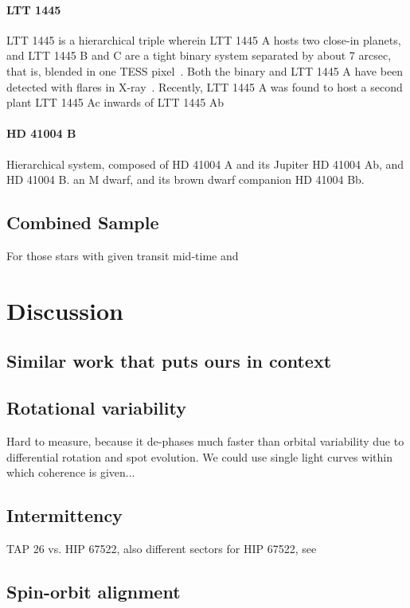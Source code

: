 \documentclass[twocolumn]{aastex631}
\begin{document}
\paragraph{LTT 1445}
 LTT 1445 is a hierarchical triple wherein LTT 1445 A hosts two close-in planets, and LTT 1445 B and C are a tight binary system separated by about 7 arcsec, that is, blended in one TESS pixel~\citep{winters2019three}. Both the binary and LTT 1445 A have been detected with flares in X-ray~\citep{brown2022xray}. Recently, LTT 1445 A was found to host a second plant LTT 1445 Ac inwards of LTT 1445 Ab~\citep{lavie2022planetary}

\paragraph{HD 41004 B}
Hierarchical system, composed of HD 41004 A and its Jupiter HD 41004 Ab, and HD 41004 B. an M dwarf, and its brown dwarf companion HD 41004 Bb. 

\subsection{Combined Sample}

For those stars with given transit mid-time and 
\section{Discussion}
\label{sec:discussion}

\subsection{Similar work that puts ours in context}

\subsection{Rotational variability}
Hard to measure, because it de-phases much faster than orbital variability due to differential rotation and spot evolution. We could use single light curves within which coherence is given...

\subsection{Intermittency}

TAP 26 vs. HIP 67522, also different sectors for HIP 67522, see \cite{shkolnik2008nature}

\subsection{Spin-orbit alignment}


\end{document}
